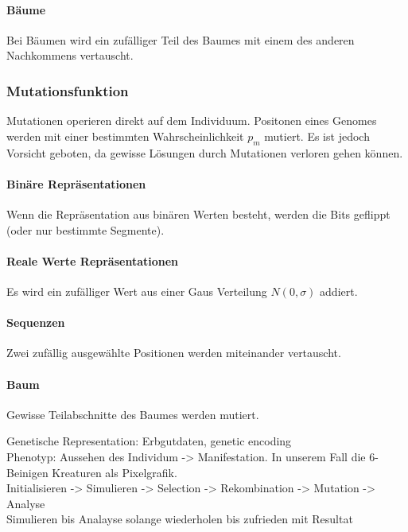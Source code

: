         \paragraph{Bäume}
          Bei Bäumen wird ein zufälliger Teil des Baumes mit einem des anderen Nachkommens vertauscht.

    \subsubsection{Mutationsfunktion}
      Mutationen operieren direkt auf dem Individuum. Positonen eines Genomes werden mit einer bestimmten Wahrscheinlichkeit \(p_{m}\) mutiert.
      Es ist jedoch Vorsicht geboten, da gewisse Lösungen durch Mutationen verloren gehen können.

      \paragraph{Binäre Repräsentationen}
        Wenn die Repräsentation aus binären Werten besteht, werden die Bits geflippt (oder nur bestimmte Segmente).

      \paragraph{Reale Werte Repräsentationen}
        Es wird ein zufälliger Wert aus einer Gaus Verteilung \(N(0,\sigma)\) addiert.

      \paragraph{Sequenzen}
        Zwei zufällig ausgewählte Positionen werden miteinander vertauscht.

      \paragraph{Baum}
        Gewisse Teilabschnitte des Baumes werden mutiert.


    Genetische Representation: Erbgutdaten, genetic encoding \\
    Phenotyp: Aussehen des Individum -> Manifestation. In unserem Fall die 6-Beinigen Kreaturen als Pixelgrafik. \\
    Initialisieren -> Simulieren -> Selection -> Rekombination -> Mutation -> Analyse \\
    Simulieren bis Analayse solange wiederholen bis zufrieden mit Resultat


